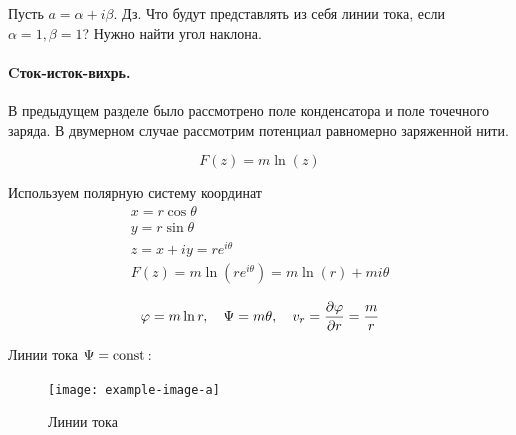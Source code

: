 Пусть $a=\alpha + i\beta$.
Дз. Что будут представлять из себя линии тока, если $\alpha=1,\beta=1$? Нужно найти угол наклона.

\paragraph{Cток-исток-вихрь.} В предыдущем разделе было рассмотрено поле конденсатора и поле точечного заряда. В двумерном случае рассмотрим потенциал равномерно заряженной нити.

\begin{equation}
	F(z)=m\ln(z)
\end{equation}

Используем полярную систему координат
\begin{gather}
	\label{eqss}
	x=r\cos\theta\\
	y=r\sin\theta\\
	z=x+iy=re^{i\theta}\\
	F(z)=m\ln(re^{i\theta})=m\ln(r)+mi\theta
\end{gather}

\begin{equation}
	\varphi=m\ln{r}, \quad \Psi=m\theta, \quad v_r=\pdv{\varphi}{r}=\frac{m}{r}
\end{equation}

Линии тока $\Psi=\mathrm{const}\,$:
\begin{figure}[h!]
    \centering
    \texttt{[image: example-image-a]}
    \caption{Линии тока}
    \label{fig:figure1}
\end{figure}

